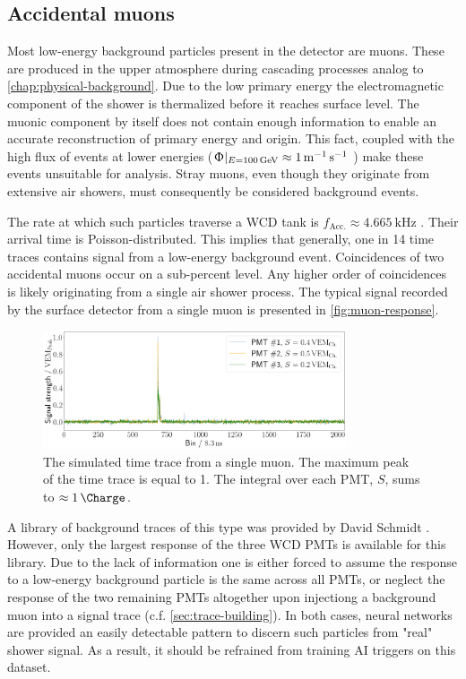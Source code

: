 \subsection{Accidental muons}
\label{ssec:accidental-muons}

Most low-energy background particles present in the detector are muons. These are produced in the upper atmosphere during cascading processes analog to 
\autoref{chap:physical-background}. Due to the low primary energy the electromagnetic component of the shower is thermalized before it reaches surface level. The 
muonic component by itself does not contain enough information to enable an accurate reconstruction of primary energy and origin. This fact, coupled with the high
flux of events at lower energies ($\Upphi|_{E=\SI{100}{\giga\electronvolt}} \approx \SI[per-mode=power]{1}{\per\meter\per\second}$ \cite{boezio2000measurement}) 
make these events unsuitable for analysis. Stray muons, even though they originate from extensive air showers, must consequently be considered background events.

The rate at which such particles traverse a WCD tank is $f_\text{Acc.}\approx\SI{4.665}{\kilo\hertz}$ \cite{DavidBackgroundSim}. Their arrival time is 
Poisson-distributed. This implies that generally, one in 14 time traces contains signal from a low-energy background event. Coincidences of two accidental 
muons occur on a sub-percent level. Any higher order of coincidences is likely originating from a single air shower process. The typical signal recorded by the 
surface detector from a single muon is presented in \autoref{fig:muon-response}.

\begin{figure}
	\centering
	\includegraphics[width=0.8\textwidth]{./plots/muon_response.png}
	\caption{The simulated time trace from a single muon. The maximum peak of the time trace is equal to \SI{1}{\Peak}. The integral over each PMT, $S$, sums to
    $\approx\SI{1}{\Charge}$.}
	\label{fig:muon-response}
\end{figure}

A library of background traces of this type was provided by David Schmidt \cite{DavidBackgroundSim}. However, only the largest response of the three WCD PMTs is
available for this library. Due to the lack of information one is either forced to assume the response to a low-energy background particle is the same across all 
PMTs, or neglect the response of the two remaining PMTs altogether upon injectiong a background muon into a signal trace (c.f. \autoref{sec:trace-building}). In 
both cases, neural networks are provided an easily detectable pattern to discern such particles from "real" shower signal. As a result, it should be refrained 
from training AI triggers on this dataset.

